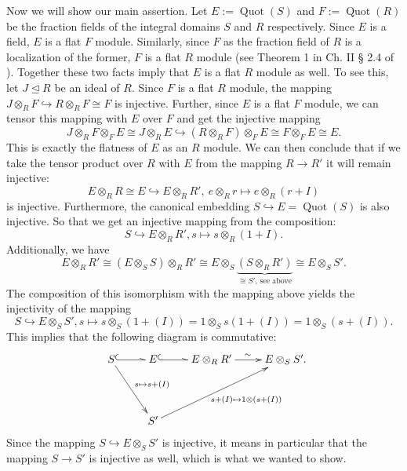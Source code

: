 \begin{prop}
\begin{bew}
Now we will show our main assertion. Let $E := \operatorname{Quot}(S)$ and $F :=  \operatorname{Quot}(R)$ be the fraction fields of the integral domains $S$ and $R$ respectively.
Since $E$ is a field, $E$ is a flat $F$ module. Similarly, since $F$ as the fraction field of $R$ is a localization of the former, $F$ is a flat $R$ module (see Theorem 1 in  Ch. II § 2.4 of \cite{bourbaki}).
Together these two facts imply that $E$ is a flat $R$ module as well. To see this, let $J \unlhd R$ be an ideal of $R$. Since $F$ is a flat $R$ module, the mapping $J \otimes_R F \hookrightarrow R \otimes_R F \cong F$ is injective.
Further, since $E$ is a flat $F$ module, we can tensor this mapping with $E$ over $F$ and get the injective mapping 
$$J \otimes_R F \otimes _F E \cong J \otimes_R E \hookrightarrow (R \otimes_R F) \otimes_F E\cong F \otimes_F E \cong E. $$
This is exactly the flatness of $E$ as an $R$ module. We can then conclude that if we take the tensor product over $R$ with $E$ from the mapping  $ R \rightarrow R'$
it will remain injective: 
$$  E \otimes_R R \cong E \hookrightarrow E \otimes_R R' , ~ e \otimes_R r \mapsto e \otimes_R (r + I)$$ is injective. 
Furthermore, the canonical embedding $S \hookrightarrow E = \operatorname{Quot}(S)$ is also injective. 
So that we get an injective mapping from the composition:
$$S \hookrightarrow E \otimes_R R', s \mapsto s \otimes_R (1 + I).$$
Additionally, we have
$$ E \otimes_R R' \cong (E \otimes_S S) \otimes_R R' \cong E \otimes_S \underbrace{(S \otimes_R R')}_{\cong S' \text{, see above}} \cong E \otimes_S S' . $$
The composition of this isomorphism with the mapping above yields the injectivity of the mapping
$$S \hookrightarrow E \otimes_S S', s \mapsto s \otimes_S (1 +(I)) = 1 \otimes_S s (1 + (I)) = 1 \otimes_S (s + (I)).$$
This implies that the following diagram is commutative:
\[
\begin{xy}
\xymatrixrowsep{3.5pc}

 \xymatrix{
      S \ar@^{(->}[r] \ar[rd]^-{ s \mapsto s + (I)} &E \ar@^{(->}[r] & E \otimes_R R' \ar[r]^\sim & E \otimes_S S' \\ 
      & S' \ar[urr]_-{~~~~~ s + (I) \mapsto 1 \otimes (s + (I)) }}
\end{xy}.
\]
Since the mapping $S \hookrightarrow E \otimes_S S'$ is injective, it means in particular that the mapping $S \rightarrow S'$ is injective as well, which is what we wanted to show.
\end{bew}
\end{prop}


